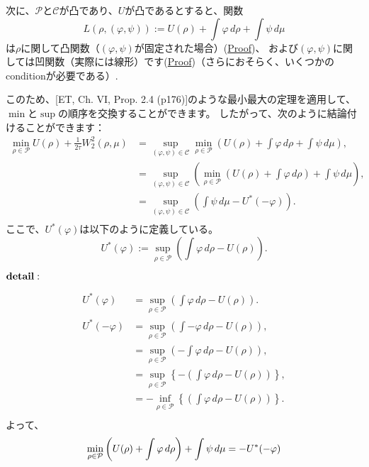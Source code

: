 \documentclass{jsarticle}
\theoremstyle{definition}
\begin{document}
次に、\(\mathcal{P}\)と\(\mathcal{C}\)が凸であり、\(U\)が凸であるとすると、関数
\[
  \label{eq:L}
  L(\rho, (\varphi, \psi)) := U(\rho) + \int \varphi \, d\rho + \int \psi \, d\mu
\]
は\hypertarget{rho_convex}{\(\rho\)に関して凸関数}（\((\varphi, \psi)\)が固定された場合）(\hyperlink{Proof:rho_convex}{Proof})、
および\hypertarget{varphipsi_concave}{\((\varphi, \psi)\)に関しては凹関数}（実際には線形）です(\hyperlink{Proof:varphipsi_concave}{Proof})（さらにおそらく、いくつかのconditionが必要である）.

このため、[ET, Ch. VI, Prop. 2.4 (p176)]のような最小最大の定理を適用して、\(\min\)と\(\sup\)の順序を交換することができます。
したがって、次のように結論付けることができます：
\begin{align*}
  \min_{\rho \in \mathcal{P}} U(\rho) + \frac{1}{2\tau} W_2^2(\rho, \mu) &= \sup_{(\varphi, \psi) \in \mathcal{C}} \min_{\rho \in \mathcal{P}} \left(U(\rho) + \int \varphi \, d\rho + \int \psi \, d\mu \right),\\
                                                                          &= \sup_{(\varphi, \psi) \in \mathcal{C}} \left(\min_{\rho \in \mathcal{P}} \left(U(\rho) + \int \varphi \, d\rho\right) + \int \psi \, d\mu\right),\\
                                                                          &= \sup_{(\varphi, \psi) \in \mathcal{C}} \left(\int \psi \, d\mu - U^*(- \varphi)\right).\\
\end{align*}
ここで、$U^*(\varphi)$は以下のように定義している。 
\[
  U^*(\varphi) := \sup_{\rho \in \mathcal{P}} \left(\int \varphi \, d\rho - U(\rho) \right).
\]

{\color{gray}
$\bold{detail:}$

\begin{align*}
  U^*(\varphi)   &= \sup_{\rho \in \mathcal{P}} \left(\int \varphi \, d\rho - U(\rho) \right).\\
  U^*(- \varphi) &= \sup_{\rho \in \mathcal{P}} \left(\int - \varphi \, d\rho - U(\rho) \right),\\
                 &= \sup_{\rho \in \mathcal{P}} \left(- \int \varphi \, d\rho - U(\rho) \right),\\
                 &= \sup_{\rho \in \mathcal{P}} \left\{ -  \left(\int \varphi \, d\rho - U(\rho) \right) \right\} ,\\
                 &= - \inf_{\rho \in \mathcal{P}} \left\{ \left(\int \varphi \, d\rho - U(\rho) \right) \right\} .\\
\end{align*}
よって、
\[
  \min_{\rho \in \mathcal{P}} \left(U(\rho) + \int \varphi \, d\rho\right) + \int \psi \, d\mu = - U^*(- \varphi)\\
\]
}
\end{document}
